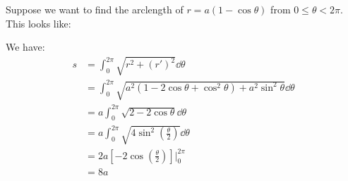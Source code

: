 \begin{itemize}
    \begin{example}
        Suppose we want to find the arclength of $r=a(1-\cos\theta)$ from $0 \le \theta < 2\pi$. This looks like:
        \begin{center}
        \end{center}
        We have:
        \begin{align}
            s &= \int_0^{2\pi}\sqrt{r^2 + (r')^2} \dd{\theta} \\ 
            &= \int_0^{2\pi}\sqrt{a^2(1-2\cos\theta+\cos^2\theta)+a^2\sin^2\theta}\dd{\theta} \\ 
            &= a\int_0^{2\pi}\sqrt{2-2\cos\theta}\dd{\theta} \\ 
            &= a \int_0^{2\pi} \sqrt{4\sin^2\left(\frac{\theta}{2}\right)} \dd{\theta} \\ 
            &= 2a\left[-2\cos\left(\frac{\theta}{2}\right)\right]\Biggr|^{2\pi}_0 \\ 
            &= 8a
        \end{align}
    \end{example}
\end{itemize}